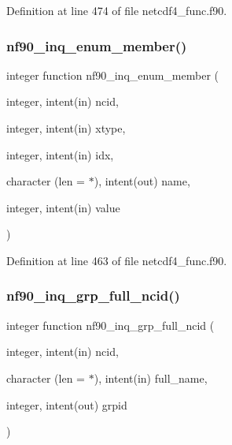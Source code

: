 Definition at line 474 of file netcdf4\+\_\+func.\+f90.

\mbox{\label{netcdf4__func_8f90_a55293eaa82b440af0ad8cffaf434db6f}} 
\subsubsection{\texorpdfstring{nf90\+\_\+inq\+\_\+enum\+\_\+member()}{nf90\_inq\_enum\_member()}}
{\footnotesize\ttfamily integer function nf90\+\_\+inq\+\_\+enum\+\_\+member (\begin{DoxyParamCaption}\item[{integer, intent(in)}]{ncid,  }\item[{integer, intent(in)}]{xtype,  }\item[{integer, intent(in)}]{idx,  }\item[{character (len = $\ast$), intent(out)}]{name,  }\item[{integer, intent(in)}]{value }\end{DoxyParamCaption})}



Definition at line 463 of file netcdf4\+\_\+func.\+f90.

\mbox{\label{netcdf4__func_8f90_a13f802e53deee92d2dff2451e584d162}} 
\subsubsection{\texorpdfstring{nf90\+\_\+inq\+\_\+grp\+\_\+full\+\_\+ncid()}{nf90\_inq\_grp\_full\_ncid()}}
{\footnotesize\ttfamily integer function nf90\+\_\+inq\+\_\+grp\+\_\+full\+\_\+ncid (\begin{DoxyParamCaption}\item[{integer, intent(in)}]{ncid,  }\item[{character (len = $\ast$), intent(in)}]{full\+\_\+name,  }\item[{integer, intent(out)}]{grpid }\end{DoxyParamCaption})}




